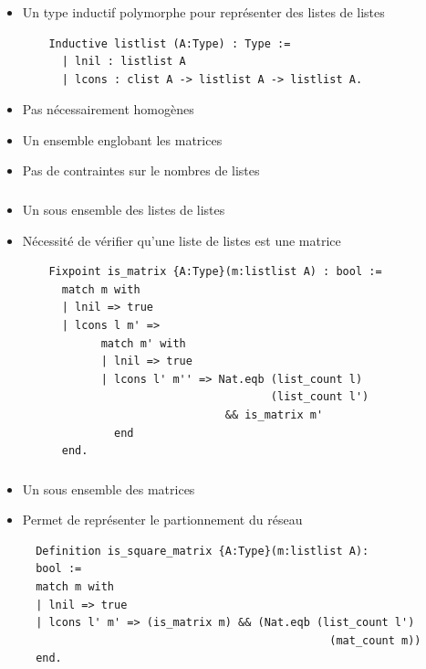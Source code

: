\documentclass[handout]{beamer}
\begin{document}
\begin{frame}[fragile]
  \frametitle<1->{}
    \begin{itemize}
    \item <1->{Un type inductif polymorphe pour représenter des listes de listes}
    \begin{lstlisting}
    Inductive listlist (A:Type) : Type :=
      | lnil : listlist A
      | lcons : clist A -> listlist A -> listlist A.
    \end{lstlisting}
    \item <2->{Pas nécessairement homogènes}
    \item <3->{Un ensemble englobant les matrices}
    \item <4->{Pas de contraintes sur le nombres de listes}
    \end{itemize}
\end{frame}

\begin{frame}[fragile]
  \frametitle<1->{}
    \begin{itemize}
    \item <1->{Un sous ensemble des listes de listes}
    \item <1->{Nécessité de vérifier qu'une liste de listes est une matrice}%
    \begin{lstlisting}
    Fixpoint is_matrix {A:Type}(m:listlist A) : bool :=
      match m with
      | lnil => true
      | lcons l m' => 
            match m' with
            | lnil => true
            | lcons l' m'' => Nat.eqb (list_count l) 
                                      (list_count l')
                               && is_matrix m'
              end
      end.
    \end{lstlisting}%
    \end{itemize}
\end{frame}

\begin{frame}[fragile]
  \frametitle<1->{}
    \begin{itemize}
    \item <1->{Un sous ensemble des matrices}
    \item <1->{Permet de représenter le partionnement du réseau}
    \begin{lstlisting}
  Definition is_square_matrix {A:Type}(m:listlist A): 
  bool :=
  match m with
  | lnil => true
  | lcons l' m' => (is_matrix m) && (Nat.eqb (list_count l') 
                                               (mat_count m))
  end.
    \end{lstlisting}%
    \end{itemize}
\end{frame}
\end{document}
